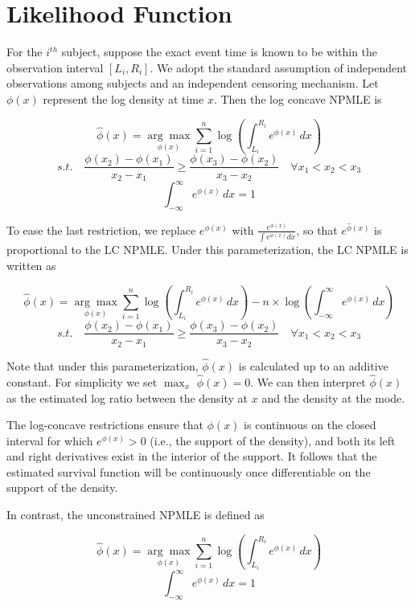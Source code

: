\documentclass[12pt]{article}
\numberwithin{equation}{section}
\begin{document}
	 
{\section {Likelihood Function}}


	For the $i^{th}$ subject, suppose the exact event time is known to be within the observation interval $[L_i, R_i]$.  We adopt the standard assumption of independent observations among subjects and an independent censoring mechanism. Let $\phi(x)$ represent the log density at time $x$.  Then the log concave NPMLE is 
	
	\[ \hat \phi(x) =\underset{\phi(x)} {\arg \max} \displaystyle \sum_{i = 1}^n \log \left( \int_{L_i}^{R_i} e^ { \phi(x) } \,dx \right)
	\]
	\[
	 s.t.\quad \frac{ \phi(x_2) - \phi(x_1)} {x_2 - x_1} \geq \frac{ \phi(x_3) - \phi(x_2)} {x_3 - x_2} \quad \forall x_1 < x_2 < x_3 
	 \]
	 \[ \int_{-\infty}^{\infty} e^{\phi (x) } \,dx = 1
		\]

	To ease the last restriction, we replace $e^{\phi(x)}$ with $\frac{e^{\phi(x)} } { \int  e^{\phi(x)} dx}$, so that $e^{\hat \phi(x)}$ is proportional to the LC NPMLE. Under this parameterization, the LC NPMLE is written as 

	\[ \hat \phi(x) = \underset{\phi(x)} {\arg \max} \displaystyle \sum_{i = 1}^n \log \left( \int_{L_i}^{R_i} e^ { \phi(x) } \,dx \right) - n \times \log \left(  \int_{-\infty}^{\infty} e^ { \phi(x) } \,dx \right) 
	\]
	\[
	 s.t.\quad \frac{ \phi(x_2) - \phi(x_1)} {x_2 - x_1} \geq \frac{ \phi(x_3) - \phi(x_2)} {x_3 - x_2}\quad \forall x_1 < x_2 < x_3 
	 \]
	
	Note that under this parameterization, $\hat \phi(x)$ is calculated up to an additive constant. For simplicity we set $\max_x $ $\hat \phi(x) = 0$. We can then interpret $\hat \phi(x)$ as the estimated log ratio between the density at $x$ and the density at the mode.

	The log-concave restrictions ensure that $\phi(x)$ is continuous on the closed interval for which $e^{\phi(x)} > 0$ (i.e., the support of the density), and both its left and right derivatives exist in the interior of the support. It follows that the estimated survival function will be continuously once differentiable on the support of the density.
	
	In contrast, the unconstrained NPMLE is defined as 

	\[ \hat \phi(x) =\underset{\phi(x)} {\arg \max} \displaystyle \sum_{i = 1}^n \log \left( \int_{L_i}^{R_i} e^ { \phi(x) } \,dx \right)
	\]
	 \[ \int_{-\infty}^{\infty} e^{\phi (x) } \,dx = 1
		\]
	
\end{document}
